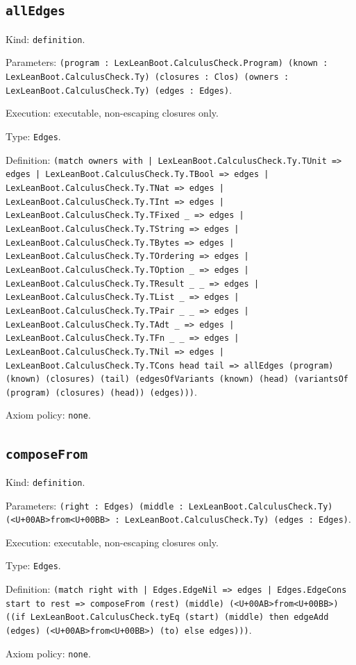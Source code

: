 \documentclass[11pt]{article}
\begin{document}
\subsection*{\texttt{allEdges}}
\noindent Kind: \texttt{definition}.\par
\noindent Parameters: \texttt{(program : LexLeanBoot.CalculusCheck.Program) (known : LexLeanBoot.CalculusCheck.Ty) (closures : Clos) (owners : LexLeanBoot.CalculusCheck.Ty) (edges : Edges)}.\par
\noindent Execution: executable, non-escaping closures only.\par
\noindent Type: \texttt{Edges}.\par
\noindent Definition: \texttt{(match owners with | LexLeanBoot.CalculusCheck.Ty.TUnit => edges | LexLeanBoot.CalculusCheck.Ty.TBool => edges | LexLeanBoot.CalculusCheck.Ty.TNat => edges | LexLeanBoot.CalculusCheck.Ty.TInt => edges | LexLeanBoot.CalculusCheck.Ty.TFixed \_ => edges | LexLeanBoot.CalculusCheck.Ty.TString => edges | LexLeanBoot.CalculusCheck.Ty.TBytes => edges | LexLeanBoot.CalculusCheck.Ty.TOrdering => edges | LexLeanBoot.CalculusCheck.Ty.TOption \_ => edges | LexLeanBoot.CalculusCheck.Ty.TResult \_ \_ => edges | LexLeanBoot.CalculusCheck.Ty.TList \_ => edges | LexLeanBoot.CalculusCheck.Ty.TPair \_ \_ => edges | LexLeanBoot.CalculusCheck.Ty.TAdt \_ => edges | LexLeanBoot.CalculusCheck.Ty.TFn \_ \_ => edges | LexLeanBoot.CalculusCheck.Ty.TNil => edges | LexLeanBoot.CalculusCheck.Ty.TCons head tail => allEdges (program) (known) (closures) (tail) (edgesOfVariants (known) (head) (variantsOf (program) (closures) (head)) (edges)))}.\par
\noindent Axiom policy: \texttt{none}.\par
\subsection*{\texttt{composeFrom}}
\noindent Kind: \texttt{definition}.\par
\noindent Parameters: \texttt{(right : Edges) (middle : LexLeanBoot.CalculusCheck.Ty) (<U+00AB>from<U+00BB> : LexLeanBoot.CalculusCheck.Ty) (edges : Edges)}.\par
\noindent Execution: executable, non-escaping closures only.\par
\noindent Type: \texttt{Edges}.\par
\noindent Definition: \texttt{(match right with | Edges.EdgeNil => edges | Edges.EdgeCons start to rest => composeFrom (rest) (middle) (<U+00AB>from<U+00BB>) ((if LexLeanBoot.CalculusCheck.tyEq (start) (middle) then edgeAdd (edges) (<U+00AB>from<U+00BB>) (to) else edges)))}.\par
\noindent Axiom policy: \texttt{none}.\par
\end{document}
